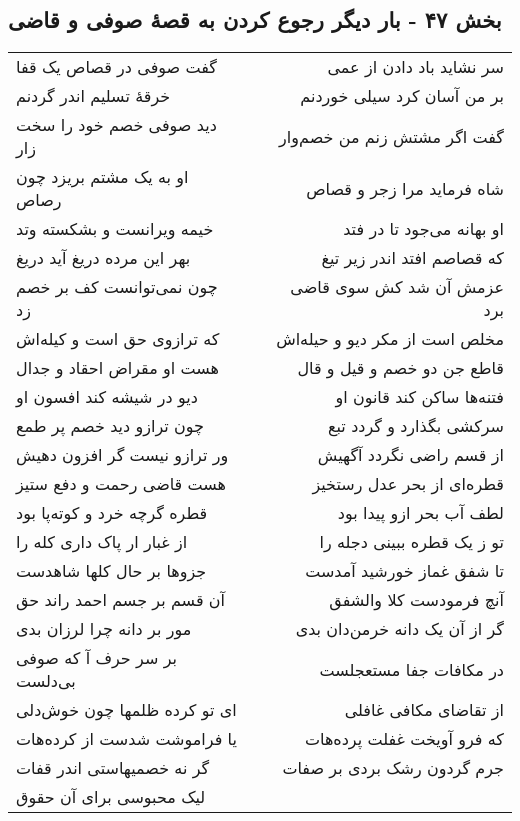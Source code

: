 \begin{center}
\section*{بخش ۴۷ - بار دیگر رجوع کردن به قصهٔ صوفی و قاضی}
\label{sec:sh047}
\begin{longtable}{l p{0.5cm} r}
گفت صوفی در قصاص یک قفا
&&
سر نشاید باد دادن از عمی
\\
خرقهٔ تسلیم اندر گردنم
&&
بر من آسان کرد سیلی خوردنم
\\
دید صوفی خصم خود را سخت زار
&&
گفت اگر مشتش زنم من خصم‌وار
\\
او به یک مشتم بریزد چون رصاص
&&
شاه فرماید مرا زجر و قصاص
\\
خیمه ویرانست و بشکسته وتد
&&
او بهانه می‌جود تا در فتد
\\
بهر این مرده دریغ آید دریغ
&&
که قصاصم افتد اندر زیر تیغ
\\
چون نمی‌توانست کف بر خصم زد
&&
عزمش آن شد کش سوی قاضی برد
\\
که ترازوی حق است و کیله‌اش
&&
مخلص است از مکر دیو و حیله‌اش
\\
هست او مقراض احقاد و جدال
&&
قاطع جن دو خصم و قیل و قال
\\
دیو در شیشه کند افسون او
&&
فتنه‌ها ساکن کند قانون او
\\
چون ترازو دید خصم پر طمع
&&
سرکشی بگذارد و گردد تبع
\\
ور ترازو نیست گر افزون دهیش
&&
از قسم راضی نگردد آگهیش
\\
هست قاضی رحمت و دفع ستیز
&&
قطره‌ای از بحر عدل رستخیز
\\
قطره گرچه خرد و کوته‌پا بود
&&
لطف آب بحر ازو پیدا بود
\\
از غبار ار پاک داری کله را
&&
تو ز یک قطره ببینی دجله را
\\
جزوها بر حال کلها شاهدست
&&
تا شفق غماز خورشید آمدست
\\
آن قسم بر جسم احمد راند حق
&&
آنچ فرمودست کلا والشفق
\\
مور بر دانه چرا لرزان بدی
&&
گر از آن یک دانه خرمن‌دان بدی
\\
بر سر حرف آ که صوفی بی‌دلست
&&
در مکافات جفا مستعجلست
\\
ای تو کرده ظلمها چون خوش‌دلی
&&
از تقاضای مکافی غافلی
\\
یا فراموشت شدست از کرده‌هات
&&
که فرو آویخت غفلت پرده‌هات
\\
گر نه خصمیهاستی اندر قفات
&&
جرم گردون رشک بردی بر صفات
\\
لیک محبوسی برای آن حقوق

\end{longtable}
\end{center}
